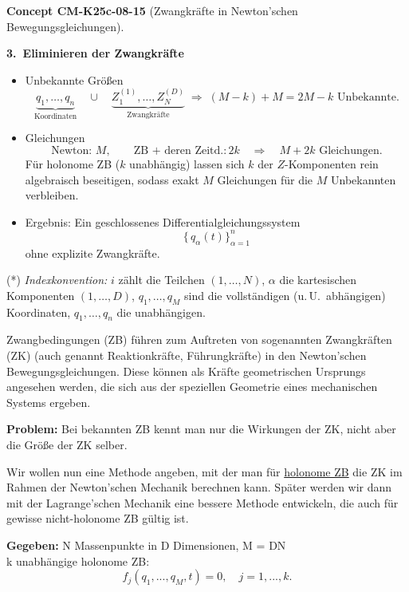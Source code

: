 \documentclass[10pt, letterpaper]{article}
\newcommand{\CustomHeading}[3]{%
  \par\medskip\noindent%
  \textbf{#1 #2} \textnormal{(#3)}.\enskip%
}
\newenvironment{CONC}[2]{\begin{unitbox}\CustomHeading{Concept}{#1}{#2}}{\end{unitbox}}
\begin{document}
\begin{CONC}{CM-K25c-08-15}{Zwangkräfte in Newton'schen Bewegungsgleichungen}
\textbf{3.\ Eliminieren der Zwangkräfte}
\begin{itemize}
  \item Unbekannte Größen  
        \[
          \underbrace{q_1,\dots,q_{n}}_{\text{Koordinaten}}
          \quad\cup\quad
          \underbrace{Z_{1}^{(1)},\dots,Z_{N}^{(D)}}_{\text{Zwangkräfte}}
          \;\Longrightarrow\;
          (M-k)+M = 2M-k \text{ Unbekannte.}
        \]
  \item Gleichungen  
        \[
          \text{Newton: } M,\qquad
          \text{ZB + deren Zeitd.}: 2k
          \quad\Longrightarrow\quad
          M+2k \text{ Gleichungen.}
        \]
        Für holonome ZB ($k$ unabhängig) lassen sich $k$ der 
        $Z$-Komponenten rein algebraisch beseitigen, sodass exakt
        $M$ Gleichungen für die $M$ Unbekannten verbleiben.
  \item Ergebnis: Ein geschlossenes Differentialgleichungssystem
        \[
          \bigl\{\,q_\alpha(t)\bigr\}_{\alpha=1}^{n}
        \]
        ohne explizite Zwangkräfte.
\end{itemize}

\medskip
\noindent
(*) \emph{Indexkonvention:} $i$ zählt die Teilchen $(1,\dots,N)$,
$\alpha$ die kartesischen Komponenten $(1,\dots,D)$,
$q_1,\dots,q_M$ sind die vollständigen (u.\,U.\ abhängigen)
Koordinaten, $q_1,\dots,q_n$ die unabhängigen.
\end{CONC}








Zwangbedingungen (ZB) führen zum Auftreten von sogenannten Zwangkräften (ZK) (auch genannt Reaktionkräfte, Führungkräfte) in den Newton'schen Bewegungsgleichungen. Diese können als Kräfte geometrischen Ursprungs angesehen werden, die sich aus der speziellen Geometrie eines mechanischen Systems ergeben.

\textbf{Problem:} Bei bekannten ZB kennt man nur die Wirkungen der ZK, nicht aber die Größe der ZK selber.

Wir wollen nun eine Methode angeben, mit der man für \underline{holonome ZB} die ZK im Rahmen der Newton'schen Mechanik berechnen kann. Später werden wir dann mit der Lagrange'schen Mechanik eine bessere Methode entwickeln, die auch für gewisse nicht-holonome ZB gültig ist.

\textbf{Gegeben:} N Massenpunkte in D Dimensionen, M = DN\\
\indent k unabhängige holonome ZB:
\[f_j(q_1,...,q_M,t) = 0, \quad j=1,...,k.\]
\end{document}
